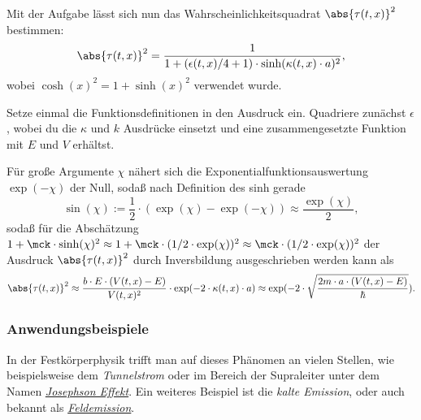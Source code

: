 \documentclass{subfiles}
\begin{document}
    Mit der Aufgabe lässt sich nun das Wahrscheinlichkeitsquadrat $\abs{\tau(t,x)}^2$ bestimmen:
    \[\abs{\tau(t,x)}^2 = \frac{1}{1+(\epsilon(t,x)/4+1)\cdot\sinh(\kappa(t,x)\cdot a)^2},\]
    wobei $\cosh(x)^2 = 1+\sinh(x)^2$ verwendet wurde. 
    \begin{Aufgabe}
        \nr{} Setze einmal die Funktionsdefinitionen in den Ausdruck ein. Quadriere zunächst $\epsilon$, wobei du die $\kappa$ und $k$ Ausdrücke einsetzt und eine zusammengesetzte Funktion mit $E$ und $V$ erhältst. 
    \end{Aufgabe}
    Für große Argumente $\chi$ nähert sich die Exponentialfunktionsauswertung $\exp(-\chi)$ der Null, sodaß nach Definition des sinh gerade
    \[\sin(\chi) := \frac{1}{2}\cdot(\exp(\chi)-\exp(-\chi)) \approx \frac{\exp(\chi)}{2},\]
    sodaß für die Abschätzung $1+\mck\cdot\sinh(\chi)^2\approx 1+\mck\cdot(1/2\cdot\exp(\chi))^2\approx \mck\cdot(1/2\cdot\exp(\chi))^2$ der Ausdruck $\abs{\tau(t,x)}^2$ durch Inversbildung ausgeschrieben werden kann als
    \[\abs{\tau(t,x)}^2\approx \frac{b\cdot E\cdot(V(t,x) - E)}{V(t,x)^2}\cdot\exp(-2\cdot\kappa(t,x)\cdot a) \approx \exp(-2\cdot\sqrt{\frac{2m\cdot a\cdot(V(t,x) - E)}{\hbar}}).\]

    \subsubsection*{Anwendungsbeispiele}
        In der Festkörperphysik trifft man auf dieses Phänomen an vielen Stellen, wie beispielsweise dem \emph{Tunnelstrom} oder im Bereich der Supraleiter unter dem Namen \href{https://de.wikipedia.org/wiki/Josephson-Effekt}{\emph{Josephson Effekt}}. Ein weiteres Beispiel ist die \emph{kalte Emission}, oder auch bekannt als \href{https://de.wikipedia.org/wiki/Feldemission}{\emph{Feldemission}}.
\end{document}
